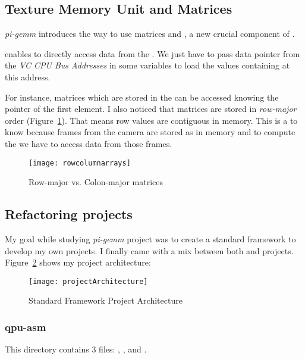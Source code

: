 \subsection{Texture Memory Unit and Matrices}\label{Matrices}

\emph{pi-gemm} introduces the way to use matrices and , a new crucial component of \vc{}.

 enables \qpu{} to directly access data from the \ram{}. We just have to pass data pointer from the \emph{VC CPU Bus Addresses} in some  variables to load the values containing at this address.

For instance, matrices which are stored in the \ram{} can be accessed knowing the pointer of the first element. I also noticed that matrices are stored in \emph{row-major} order (Figure~\ref{rowcolumnarrays}). That means row values are contiguous in \ram{} memory. This is a  to know because frames from the \rasp{} camera are stored as  in memory and to compute the \flow{} we have to access data from those frames.

\begin{figure}[!htbp]
	\centering
	\texttt{[image: rowcolumnarrays]}
	\caption{Row-major vs. Colon-major matrices}
	\label{rowcolumnarrays}
\end{figure}
\FloatBarrier


\subsection{Refactoring projects}

My goal while studying \emph{pi-gemm} project was to create a standard framework to develop my own projects. I finally came with a mix between both  and  projects. Figure~\ref{projectArchitectureFigure} shows my project architecture:

\begin{figure}[!htbp]
	\centering
	\texttt{[image: projectArchitecture]}
	\caption{Standard Framework Project Architecture}
	\label{projectArchitectureFigure}
\end{figure}
\FloatBarrier


\subsubsection{qpu-asm}

This directory contains 3 files: , , and .

